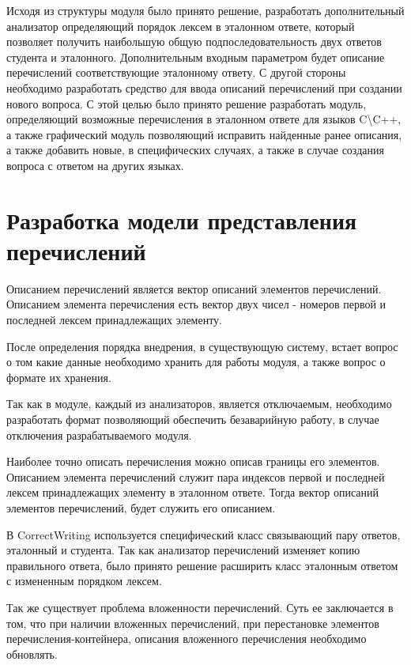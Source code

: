 \documentclass[a4paper,english,russian]{G2-105}
\begin{document}
\par Исходя из структуры модуля было принято решение, разработать дополнительный анализатор определяющий  порядок лексем в эталонном ответе, который позволяет получить наибольшую общую подпоследовательность двух ответов студента и эталонного. Дополнительным  входным параметром будет описание перечислений соответствующие эталонному ответу. 
С другой стороны необходимо разработать средство для ввода описаний перечислений при создании нового вопроса. С этой целью было принято решение разработать модуль, определяющий возможные перечисления в эталонном ответе для языков C\textbackslash C++, а также графический модуль позволяющий исправить найденные ранее описания, а также добавить новые, в специфических случаях, а также в случае создания вопроса с ответом на других языках.

\section{Разработка модели представления перечислений}
\par Описанием перечислений является вектор описаний элементов перечислений. Описанием элемента перечисления есть вектор двух чисел - номеров первой и последней лексем принадлежащих элементу.
\par После определения порядка внедрения, в существующую систему, встает вопрос о том какие данные необходимо хранить для работы модуля, а также вопрос о формате их хранения.
\par Так как в модуле, каждый из анализаторов, является отключаемым, необходимо разработать формат позволяющий обеспечить безаварийную работу, в случае отключения разрабатываемого модуля. 
\par Наиболее точно описать перечисления можно описав границы его элементов. Описанием элемента перечислений служит пара индексов первой и последней лексем принадлежащих элементу в эталонном ответе. Тогда вектор описаний элементов перечислений, будет служить его описанием.
\par В CorrectWriting используется специфический класс связывающий пару ответов, эталонный и студента. Так как анализатор перечислений изменяет копию правильного ответа, было принято решение расширить класс эталонным ответом с измененным порядком лексем.
\par Так же существует проблема вложенности перечислений. Суть ее заключается в том, что при наличии вложенных перечислений, при перестановке элементов перечисления-контейнера, описания вложенного перечисления необходимо обновлять.
\end{document}
